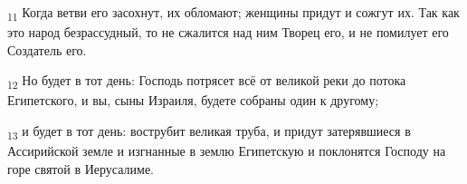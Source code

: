 \begin{tcolorbox}
\textsubscript{11} Когда ветви его засохнут, их обломают; женщины придут и сожгут их. Так как это народ безрассудный, то не сжалится над ним Творец его, и не помилует его Создатель его.
\end{tcolorbox}
\begin{tcolorbox}
\textsubscript{12} Но будет в тот день: Господь потрясет всё от великой реки до потока Египетского, и вы, сыны Израиля, будете собраны один к другому;
\end{tcolorbox}
\begin{tcolorbox}
\textsubscript{13} и будет в тот день: вострубит великая труба, и придут затерявшиеся в Ассирийской земле и изгнанные в землю Египетскую и поклонятся Господу на горе святой в Иерусалиме.
\end{tcolorbox}
